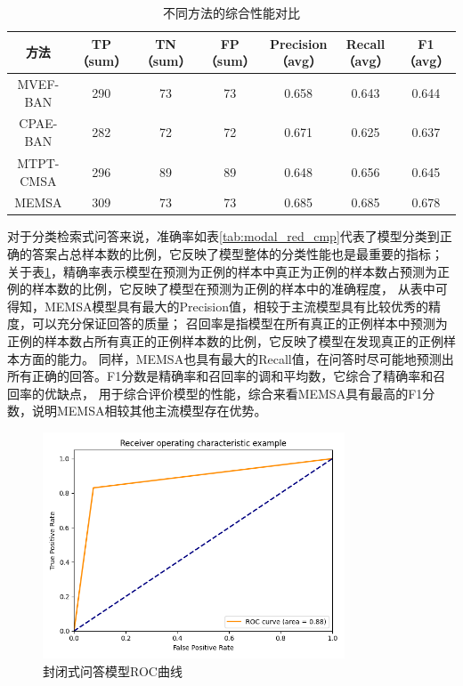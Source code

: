 \begin{table}
	\caption{\label{tab:confusionmatrix}不同方法的综合性能对比}
	\centering
	\small
	\begin{tabular}{c|cccccc}
		\hline  方法 & TP（sum） & TN（sum） & FP（sum） & Precision（avg） & Recall（avg） & F1（avg） \\
		\hline MVEF-BAN & 290 & 73 & 73 & 0.658 & 0.643 & 0.644 \\
		CPAE-BAN & 282 & 72 & 72 & 0.671 & 0.625 & 0.637 \\
		MTPT-CMSA & 296 & 89 & 89 & 0.648 & 0.656 & 0.645 \\
		MEMSA & 309 & 73 & 73 & 0.685 & 0.685 & $\mathbf{0.678}$ \\
		\hline
		\end{tabular}
\end{table}

对于分类检索式问答来说，准确率如表\ref{tab:modal_red_cmp}代表了模型分类到正确的答案占总样本数的比例，它反映了模型整体的分类性能也是最重要的指标；
关于表\ref{tab:confusionmatrix}，精确率表示模型在预测为正例的样本中真正为正例的样本数占预测为正例的样本数的比例，它反映了模型在预测为正例的样本中的准确程度，
从表中可得知，MEMSA模型具有最大的Precision值，相较于主流模型具有比较优秀的精度，可以充分保证回答的质量；
召回率是指模型在所有真正的正例样本中预测为正例的样本数占所有真正的正例样本数的比例，它反映了模型在发现真正的正例样本方面的能力。
同样，MEMSA也具有最大的Recall值，在问答时尽可能地预测出所有正确的回答。F1分数是精确率和召回率的调和平均数，它综合了精确率和召回率的优缺点，
用于综合评价模型的性能，综合来看MEMSA具有最高的F1分数，说明MEMSA相较其他主流模型存在优势。
\begin{figure}[htbp]
	\centering	
	\includegraphics[width=0.8\textwidth]{Fig/myfig/chapter3/all_roc.png}  %
	\caption{\label{all_roc}封闭式问答模型ROC曲线} 
\end{figure}

